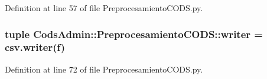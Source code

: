 \-Definition at line 57 of file \-Preprocesamiento\-C\-O\-D\-S.\-py.

\subsubsection[{writer}]{\setlength{\rightskip}{0pt plus 5cm}tuple {\bf \-Cods\-Admin\-::\-Preprocesamiento\-C\-O\-D\-S\-::writer} = csv.\-writer(f)}\label{namespace_cods_admin_1_1_preprocesamiento_c_o_d_s_a01b616c59fdd6c42930084b9c9cd9b12}


\-Definition at line 72 of file \-Preprocesamiento\-C\-O\-D\-S.\-py.

